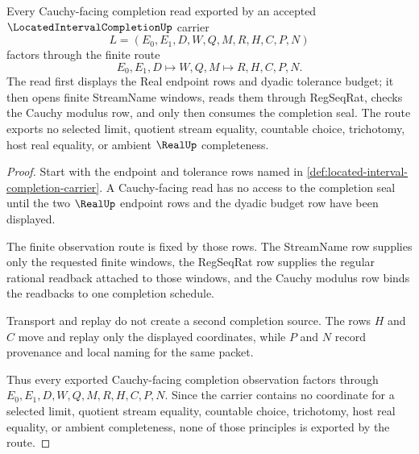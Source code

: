 \begin{theorem}
\label{thm:located-interval-completion-cauchy-seal-route}
Every Cauchy-facing completion read exported by an accepted $\LocatedIntervalCompletionUp$ carrier
$$
L=(E_0,E_1,D,W,Q,M,R,H,C,P,N)
$$
factors through the finite route
$$
E_0,E_1,D \longmapsto W,Q,M \longmapsto R,H,C,P,N .
$$
The read first displays the Real endpoint rows and dyadic tolerance budget; it then opens finite StreamName windows, reads them through RegSeqRat, checks the Cauchy modulus row, and only then consumes the completion seal. The route exports no selected limit, quotient stream equality, countable choice, trichotomy, host real equality, or ambient $\RealUp$ completeness.
\end{theorem}
\begin{proof}
Start with the endpoint and tolerance rows named in \autoref{def:located-interval-completion-carrier}. A Cauchy-facing read has no access to the completion seal until the two $\RealUp$ endpoint rows and the dyadic budget row have been displayed.

The finite observation route is fixed by those rows. The StreamName row supplies only the requested finite windows, the RegSeqRat row supplies the regular rational readback attached to those windows, and the Cauchy modulus row binds the readbacks to one completion schedule.

Transport and replay do not create a second completion source. The rows $H$ and $C$ move and replay only the displayed coordinates, while $P$ and $N$ record provenance and local naming for the same packet.

Thus every exported Cauchy-facing completion observation factors through $E_0,E_1,D,W,Q,M,R,H,C,P,N$. Since the carrier contains no coordinate for a selected limit, quotient stream equality, countable choice, trichotomy, host real equality, or ambient completeness, none of those principles is exported by the route.
\end{proof}



